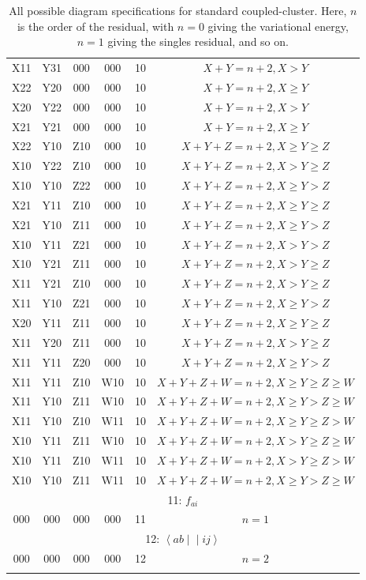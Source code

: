 \documentclass{article}
\newcommand{\tei}[2]{\left<{#1}\middle|\middle|{#2}\right>}
\begin{document}
\begin{longtable}{cccccc}
    X11 & Y31 & 000 & 000 & 10 & $X + Y = n + 2, X > Y$\\
    X22 & Y20 & 000 & 000 & 10 & $X + Y = n + 2, X \ge Y$\\
    X20 & Y22 & 000 & 000 & 10 & $X + Y = n + 2, X > Y$\\
    X21 & Y21 & 000 & 000 & 10 & $X + Y = n + 2, X \ge Y$\\
    X22 & Y10 & Z10 & 000 & 10 & $X + Y + Z = n + 2, X \ge Y \ge Z$\\
    X10 & Y22 & Z10 & 000 & 10 & $X + Y + Z = n + 2, X > Y \ge Z$\\
    X10 & Y10 & Z22 & 000 & 10 & $X + Y + Z = n + 2, X \ge Y > Z$\\
    X21 & Y11 & Z10 & 000 & 10 & $X + Y + Z = n + 2, X \ge Y \ge Z$\\
    X21 & Y10 & Z11 & 000 & 10 & $X + Y + Z = n + 2, X \ge Y > Z$\\
    X10 & Y11 & Z21 & 000 & 10 & $X + Y + Z = n + 2, X > Y > Z$\\
    X10 & Y21 & Z11 & 000 & 10 & $X + Y + Z = n + 2, X > Y \ge Z$\\
    X11 & Y21 & Z10 & 000 & 10 & $X + Y + Z = n + 2, X > Y \ge Z$\\
    X11 & Y10 & Z21 & 000 & 10 & $X + Y + Z = n + 2, X \ge Y > Z$\\
    X20 & Y11 & Z11 & 000 & 10 & $X + Y + Z = n + 2, X \ge Y \ge Z$\\
    X11 & Y20 & Z11 & 000 & 10 & $X + Y + Z = n + 2, X > Y \ge Z$\\
    X11 & Y11 & Z20 & 000 & 10 & $X + Y + Z = n + 2, X \ge Y > Z$\\
    X11 & Y11 & Z10 & W10 & 10 & $X + Y + Z + W = n + 2, X \ge Y \ge Z \ge W$\\
    X11 & Y10 & Z11 & W10 & 10 & $X + Y + Z + W = n + 2, X \ge Y > Z \ge W$\\
    X11 & Y10 & Z10 & W11 & 10 & $X + Y + Z + W = n + 2, X \ge Y \ge Z > W$\\
    X10 & Y11 & Z11 & W10 & 10 & $X + Y + Z + W = n + 2, X > Y \ge Z \ge W$\\
    X10 & Y11 & Z10 & W11 & 10 & $X + Y + Z + W = n + 2, X > Y \ge Z > W$\\
    X10 & Y10 & Z11 & W11 & 10 & $X + Y + Z + W = n + 2, X \ge Y > Z \ge W$\\
    \hline
    \multicolumn{6}{c}{11: $f_{ai}$}\\
    \hline
    000 & 000 & 000 & 000 & 11 & $n = 1$\\
    \hline
    \multicolumn{6}{c}{12: $\tei{ab}{ij}$}\\
    \hline
    000 & 000 & 000 & 000 & 12 & $n = 2$\\
  \caption{All possible diagram specifications for standard coupled-cluster. Here, $n$ is the order of the residual, with $n = 0$ giving the variational energy, $n = 1$ giving the singles residual, and so on.}
  \label{diagrams}
\end{longtable}
\end{document}
